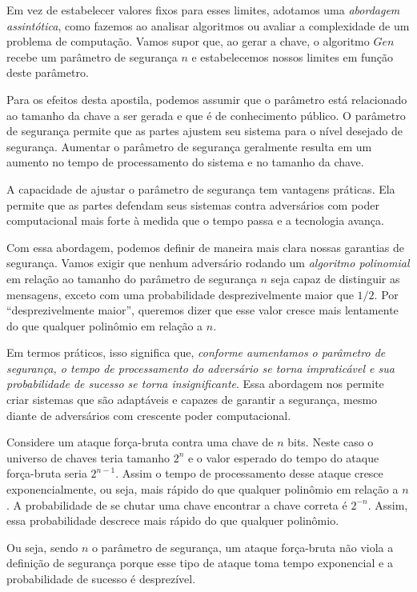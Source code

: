 Em vez de estabelecer valores fixos para esses limites, adotamos uma {\em abordagem assintótica}, como fazemos ao analisar algoritmos ou avaliar a complexidade de um problema de computação.
Vamos supor que, ao gerar a chave, o algoritmo $Gen$ recebe um parâmetro de segurança $n$ e estabelecemos nossos limites em função deste parâmetro.

Para os efeitos desta apostila, podemos assumir que o parâmetro está relacionado ao tamanho da chave a ser gerada e que é de conhecimento público.
O parâmetro de segurança permite que as partes ajustem seu sistema para o nível desejado de segurança.
Aumentar o parâmetro de segurança geralmente resulta em um aumento no tempo de processamento do sistema e no tamanho da chave.

A capacidade de ajustar o parâmetro de segurança tem vantagens práticas.
Ela permite que as partes defendam seus sistemas contra adversários com poder computacional mais forte à medida que o tempo passa e a tecnologia avança.


Com essa abordagem, podemos definir de maneira mais clara nossas garantias de segurança.
Vamos exigir que nenhum adversário rodando um {\em algoritmo polinomial} em relação ao tamanho do parâmetro de segurança $n$ seja capaz de distinguir as mensagens, exceto com uma probabilidade desprezivelmente maior que $1/2$.
Por ``desprezivelmente maior'', queremos dizer que esse valor cresce mais lentamente do que qualquer polinômio em relação a $n$.

Em termos práticos, isso significa que, {\em conforme aumentamos o parâmetro de segurança, o tempo de processamento do adversário se torna impraticável e sua probabilidade de sucesso se torna insignificante}.
Essa abordagem nos permite criar sistemas que são adaptáveis e capazes de garantir a segurança, mesmo diante de adversários com crescente poder computacional.

\begin{example}
  Considere um ataque força-bruta contra uma chave de $n$ bits.
  Neste caso o universo de chaves teria tamanho $2^n$ e o valor esperado do tempo do ataque força-bruta seria $2^{n-1}$.
  Assim o tempo de processamento desse ataque cresce exponencialmente, ou seja, mais rápido do que qualquer polinômio em relação a $n$.
  A probabilidade de se chutar uma chave encontrar a chave correta é $2^{-n}$.
  Assim, essa probabilidade descrece mais rápido do que qualquer polinômio.

  Ou seja, sendo $n$ o parâmetro de segurança, um ataque força-bruta não viola a definição de segurança porque esse tipo de ataque toma tempo exponencial e a probabilidade de sucesso é desprezível.
\end{example}


